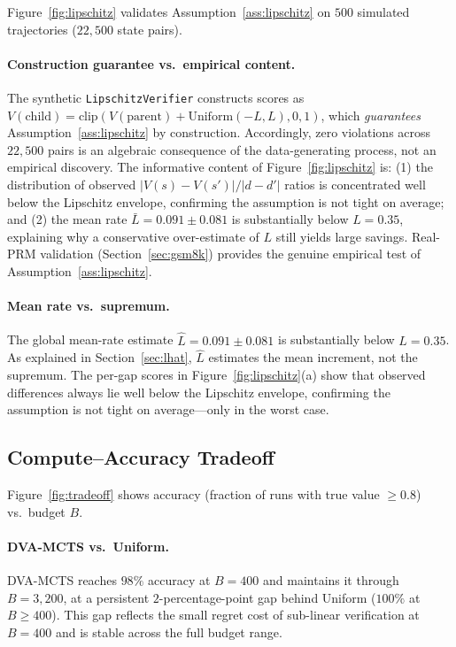 Figure~\ref{fig:lipschitz} validates Assumption~\ref{ass:lipschitz} on $500$
simulated trajectories ($22{,}500$ state pairs).

\paragraph{Construction guarantee vs.\ empirical content.}
The synthetic \texttt{LipschitzVerifier} constructs scores as
$V(\text{child}) = \text{clip}(V(\text{parent}) + \mathrm{Uniform}(-L, L), 0, 1)$,
which \emph{guarantees} Assumption~\ref{ass:lipschitz} by construction.
Accordingly, zero violations across $22{,}500$ pairs is an algebraic consequence
of the data-generating process, not an empirical discovery.  The informative
content of Figure~\ref{fig:lipschitz} is: (1) the distribution of observed
$|V(s){-}V(s')|/|d{-}d'|$ ratios is concentrated well below the Lipschitz
envelope, confirming the assumption is not tight on average; and (2) the
mean rate $\bar{L}{=}0.091 \pm 0.081$ is substantially below $L{=}0.35$,
explaining why a conservative over-estimate of $L$ still yields large savings.
Real-PRM validation (Section~\ref{sec:gsm8k}) provides the genuine empirical test
of Assumption~\ref{ass:lipschitz}.

\paragraph{Mean rate vs.\ supremum.}
The global mean-rate estimate $\hat{L}{=}0.091 \pm 0.081$ is substantially below
$L{=}0.35$. As explained in Section~\ref{sec:lhat}, $\hat{L}$ estimates the mean
increment, not the supremum. The per-gap scores in Figure~\ref{fig:lipschitz}(a)
show that observed differences always lie well below the Lipschitz envelope,
confirming the assumption is not tight on average---only in the worst case.

\subsection{Compute--Accuracy Tradeoff}
\label{sec:tradeoff_results}

Figure~\ref{fig:tradeoff} shows accuracy (fraction of runs with true value $\geq 0.8$)
vs.\ budget $B$.

\paragraph{DVA-MCTS vs.\ Uniform.}
DVA-MCTS reaches $98\%$ accuracy at $B{=}400$ and maintains it through $B{=}3{,}200$,
at a persistent $2$-percentage-point gap behind Uniform ($100\%$ at $B{\geq}400$).
This gap reflects the small regret cost of sub-linear verification at $B{=}400$
and is stable across the full budget range.

